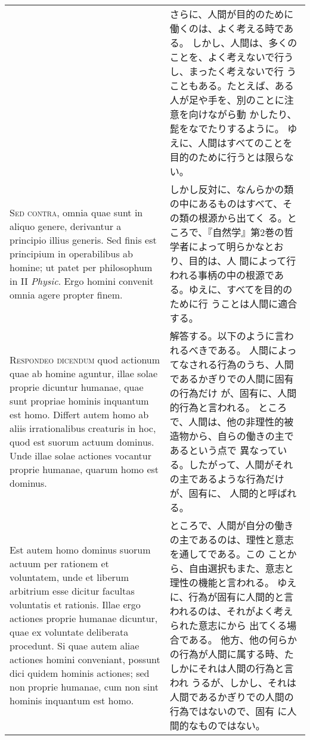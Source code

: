 \documentclass[10pt]{jsarticle} %
\begin{document}
\begin{longtable}{p{21em}p{21em}}
&

さらに、人間が目的のために働くのは、よく考える時である。
しかし、人間は、多くのことを、よく考えないで行うし、まったく考えないで行
 うこともある。たとえば、ある人が足や手を、別のことに注意を向けながら動
 かしたり、髭をなでたりするように。
ゆえに、人間はすべてのことを目的のために行うとは限らない。


\\


{\scshape Sed contra}, omnia quae sunt in aliquo
genere, derivantur a principio illius generis. Sed finis est principium
in operabilibus ab homine; ut patet per philosophum in II {\itshape Physic}. Ergo
homini convenit omnia agere propter finem.

&


しかし反対に、なんらかの類の中にあるものはすべて、その類の根源から出てく
 る。ところで、『自然学』第2巻の哲学者によって明らかなとおり、目的は、人
 間によって行われる事柄の中の根源である。ゆえに、すべてを目的のために行
 うことは人間に適合する。

\\


{\scshape Respondeo dicendum} quod actionum quae ab
homine aguntur, illae solae proprie dicuntur humanae, quae sunt propriae
hominis inquantum est homo. Differt autem homo ab aliis irrationalibus
creaturis in hoc, quod est suorum actuum dominus. Unde illae solae
actiones vocantur proprie humanae, quarum homo est dominus. 


&

解答する。以下のように言われるべきである。
人間によってなされる行為のうち、人間であるかぎりでの人間に固有の行為だけ
 が、固有に、人間的行為と言われる。
ところで、人間は、他の非理性的被造物から、自らの働きの主であるという点で
 異なっている。したがって、人間がそれの主であるような行為だけが、固有に、
 人間的と呼ばれる。


\\

Est autem
homo dominus suorum actuum per rationem et voluntatem, unde et liberum
arbitrium esse dicitur facultas voluntatis et rationis. Illae ergo
actiones proprie humanae dicuntur, quae ex voluntate deliberata
procedunt. Si quae autem aliae actiones homini conveniant, possunt dici
quidem hominis actiones; sed non proprie humanae, cum non sint hominis
inquantum est homo. 

&

ところで、人間が自分の働きの主であるのは、理性と意志を通してである。この
 ことから、自由選択もまた、意志と理性の機能と言われる。
ゆえに、行為が固有に人間的と言われるのは、それがよく考えられた意志にから
 出てくる場合である。
他方、他の何らかの行為が人間に属する時、たしかにそれは人間の行為と言われ
 うるが、しかし、それは人間であるかぎりでの人間の行為ではないので、固有
 に人間的なものではない。



\end{longtable}
\end{document}
